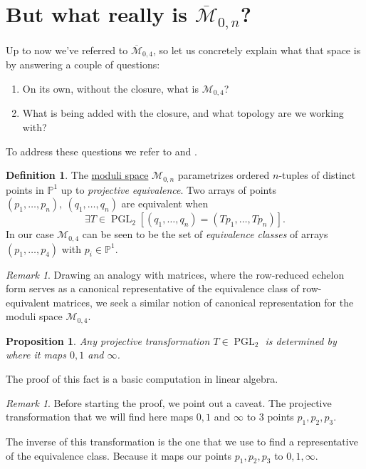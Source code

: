 \documentclass[11pt]{article}
\newcommand{\bP}{\mathbb{P}}
\newcommand{\ov}{\overline}        %
\newcommand{\cM}{\mathcal{M}}           %
\DeclareMathOperator{\PGL}{PGL} %
\newtheorem{Prop}{Proposition}         %
\theoremstyle{definition}
\newtheorem{Def}{Definition}           %
\theoremstyle{remark}
\newtheorem{Rmk}[Th]{Remark}      %
\numberwithin{theorem}{section}
\begin{document}
\section{But what really is $\ov{\cM}_{0,n}$?}

Up to now we've referred to $\ov{\cM}_{0,4}$, so let us concretely explain what that space is by answering a couple of questions:
\begin{enumerate}
    \itemsep=-0.4em
    \item On its own, without the closure, what is $\cM_{0,4}$?
    \item What is being added with the closure, and what topology are we working with?
\end{enumerate}

To address these questions we refer to \cite{RenzoNotes} and \cite{cavalieri2021projective}. 

\begin{Def}
    The \underline{moduli space} $\cM_{0,n}$ parametrizes ordered $n$-tuples of distinct points in $\bP^1$ up to \emph{projective equivalence}. Two arrays of points $(p_1,\dots,p_n),\ (q_1,\dots,q_n)$ are equivalent when 
    $$\exists T\in\PGL_2\left[(q_1,\dots,q_n)=(Tp_1,\dots,Tp_n)\right].$$
    In our case $\cM_{0,4}$ can be seen to be the set of \emph{equivalence classes} of arrays $(p_1,\dots,p_4)$ with $p_i\in\bP^1$. 
\end{Def}

\begin{Rmk}
    Drawing an analogy with matrices, where the row-reduced echelon form serves as a canonical representative of the equivalence class of row-equivalent matrices, we seek a similar notion of canonical representation for the moduli space $\cM_{0,4}$.
\end{Rmk}

\begin{Prop}
    Any projective transformation $T\in\PGL_2$ is determined by where it maps $0,1$ and $\infty$. 
\end{Prop}

The proof of this fact is a basic computation in linear algebra.

\begin{Rmk}
    Before starting the proof, we point out a caveat. The projective transformation that we will find here maps $0,1$ and $\infty$ to $3$ points $p_1,p_2,p_3$.\par 
    The inverse of this transformation is the one that we use to find a representative of the equivalence class. Because it maps our points $p_1,p_2,p_3$ to $0,1,\infty$. 
\end{Rmk}
\end{document}
